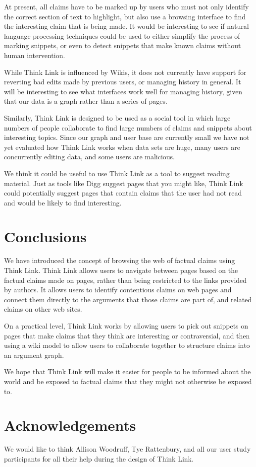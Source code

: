 \documentclass{chi2009}
\begin{document}
At present, all claims have to be marked up by users who must not only identify the correct section of text to highlight, but also use a browsing interface to find the interesting claim that is being made. It would be interesting to see if natural language processing techniques could be used to either simplify the process of marking snippets, or even to detect snippets that make known claims without human intervention.

While Think Link is influenced by Wikis, it does not currently have support for reverting bad edits made by previous users, or managing history in general. It will be interesting to see what interfaces work well for managing history, given that our data is a graph rather than a series of pages.

Similarly, Think Link is designed to be used as a social tool in which large numbers of people collaborate to find large numbers of claims and snippets about interesting topics. Since our graph and user base are currently small we have not yet evaluated how Think Link works when data sets are huge, many users are concurrently editing data, and some users are malicious.

We think it could be useful to use Think Link as a tool to suggest reading material. Just as tools like Digg suggest pages that you might like, Think Link could potentially suggest pages that contain claims that the user had not read and would be likely to find interesting.


\section{Conclusions}

We have introduced the concept of browsing the web of factual claims using Think Link. Think Link allows users to navigate between pages based on the factual claims made on pages, rather than being restricted to the links provided by authors. It allows users to identify contentious claims on web pages and connect them directly to the arguments that those claims are part of, and related claims on other web sites.

On a practical level, Think Link works by allowing users to pick out snippets on pages that make claims that they think are interesting or contraversial, and then using a wiki model to allow users to collaborate together to structure claims into an argument graph.

We hope that Think Link will make it easier for people to be informed about the world and be exposed to factual claims that they might not otherwise be exposed to.

\section{Acknowledgements}

We would like to think Allison Woodruff, Tye Rattenbury, and all our user study participants for all their help during the design of Think Link.




\end{document}
